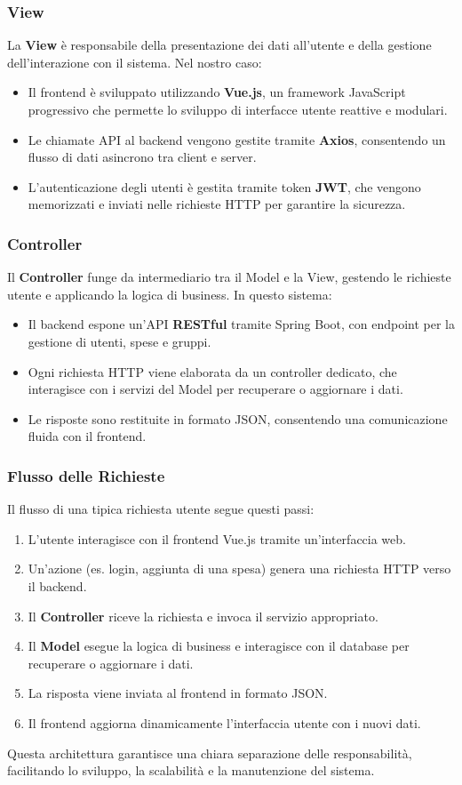 \subsubsection{View}
La \textbf{View} è responsabile della presentazione dei dati all'utente e della gestione dell'interazione con il sistema. Nel nostro caso:
\begin{itemize}
    \item Il frontend è sviluppato utilizzando \textbf{Vue.js}, un framework JavaScript progressivo che permette lo sviluppo di interfacce utente reattive e modulari.
    \item Le chiamate API al backend vengono gestite tramite \textbf{Axios}, consentendo un flusso di dati asincrono tra client e server.
    \item L'autenticazione degli utenti è gestita tramite token \textbf{JWT}, che vengono memorizzati e inviati nelle richieste HTTP per garantire la sicurezza.
\end{itemize}

\subsubsection{Controller}
Il \textbf{Controller} funge da intermediario tra il Model e la View, gestendo le richieste utente e applicando la logica di business. In questo sistema:
\begin{itemize}
    \item Il backend espone un'API \textbf{RESTful} tramite Spring Boot, con endpoint per la gestione di utenti, spese e gruppi.
    \item Ogni richiesta HTTP viene elaborata da un controller dedicato, che interagisce con i servizi del Model per recuperare o aggiornare i dati.
    \item Le risposte sono restituite in formato JSON, consentendo una comunicazione fluida con il frontend.
\end{itemize}

\subsubsection{Flusso delle Richieste}
Il flusso di una tipica richiesta utente segue questi passi:
\begin{enumerate}
    \item L'utente interagisce con il frontend Vue.js tramite un'interfaccia web.
    \item Un'azione (es. login, aggiunta di una spesa) genera una richiesta HTTP verso il backend.
    \item Il \textbf{Controller} riceve la richiesta e invoca il servizio appropriato.
    \item Il \textbf{Model} esegue la logica di business e interagisce con il database per recuperare o aggiornare i dati.
    \item La risposta viene inviata al frontend in formato JSON.
    \item Il frontend aggiorna dinamicamente l'interfaccia utente con i nuovi dati.
\end{enumerate}
Questa architettura garantisce una chiara separazione delle responsabilità, facilitando lo sviluppo, la scalabilità e la manutenzione del sistema.

